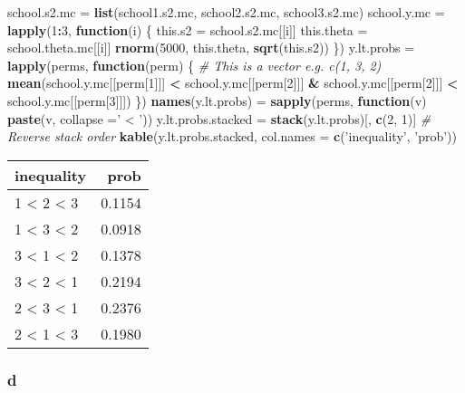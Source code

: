 \documentclass[]{article}
\newenvironment{Shaded}{\begin{snugshade}}{\end{snugshade}}
\newcommand{\CommentTok}[1]{\textcolor[rgb]{0.56,0.35,0.01}{\textit{#1}}}
\newcommand{\ControlFlowTok}[1]{\textcolor[rgb]{0.13,0.29,0.53}{\textbf{#1}}}
\newcommand{\DataTypeTok}[1]{\textcolor[rgb]{0.13,0.29,0.53}{#1}}
\newcommand{\DecValTok}[1]{\textcolor[rgb]{0.00,0.00,0.81}{#1}}
\newcommand{\KeywordTok}[1]{\textcolor[rgb]{0.13,0.29,0.53}{\textbf{#1}}}
\newcommand{\NormalTok}[1]{#1}
\newcommand{\OperatorTok}[1]{\textcolor[rgb]{0.81,0.36,0.00}{\textbf{#1}}}
\newcommand{\StringTok}[1]{\textcolor[rgb]{0.31,0.60,0.02}{#1}}
\begin{document}
\begin{Shaded}
\begin{Highlighting}[]
\NormalTok{school.s2.mc =}\StringTok{ }\KeywordTok{list}\NormalTok{(school1.s2.mc, school2.s2.mc, school3.s2.mc)}
\NormalTok{school.y.mc =}\StringTok{ }\KeywordTok{lapply}\NormalTok{(}\DecValTok{1}\OperatorTok{:}\DecValTok{3}\NormalTok{, }\ControlFlowTok{function}\NormalTok{(i) \{}
\NormalTok{  this.s2 =}\StringTok{ }\NormalTok{school.s2.mc[[i]]}
\NormalTok{  this.theta =}\StringTok{ }\NormalTok{school.theta.mc[[i]]}
  \KeywordTok{rnorm}\NormalTok{(}\DecValTok{5000}\NormalTok{, this.theta, }\KeywordTok{sqrt}\NormalTok{(this.s2))}
\NormalTok{\})}
\NormalTok{y.lt.probs =}\StringTok{ }\KeywordTok{lapply}\NormalTok{(perms, }\ControlFlowTok{function}\NormalTok{(perm) \{}
  \CommentTok{# This is a vector e.g. c(1, 3, 2)}
  \KeywordTok{mean}\NormalTok{(school.y.mc[[perm[}\DecValTok{1}\NormalTok{]]] }\OperatorTok{<}\StringTok{ }\NormalTok{school.y.mc[[perm[}\DecValTok{2}\NormalTok{]]] }\OperatorTok{&}
\StringTok{         }\NormalTok{school.y.mc[[perm[}\DecValTok{2}\NormalTok{]]] }\OperatorTok{<}\StringTok{ }\NormalTok{school.y.mc[[perm[}\DecValTok{3}\NormalTok{]]])}
\NormalTok{\})}
\KeywordTok{names}\NormalTok{(y.lt.probs) =}\StringTok{ }\KeywordTok{sapply}\NormalTok{(perms, }\ControlFlowTok{function}\NormalTok{(v) }\KeywordTok{paste}\NormalTok{(v, }\DataTypeTok{collapse =}\StringTok{' < '}\NormalTok{))}
\NormalTok{y.lt.probs.stacked =}\StringTok{ }\KeywordTok{stack}\NormalTok{(y.lt.probs)[, }\KeywordTok{c}\NormalTok{(}\DecValTok{2}\NormalTok{, }\DecValTok{1}\NormalTok{)] }\CommentTok{# Reverse stack order}
\KeywordTok{kable}\NormalTok{(y.lt.probs.stacked, }\DataTypeTok{col.names =} \KeywordTok{c}\NormalTok{(}\StringTok{'inequality'}\NormalTok{, }\StringTok{'prob'}\NormalTok{))}
\end{Highlighting}
\end{Shaded}

\begin{longtable}[]{@{}lr@{}}
\toprule
inequality & prob\tabularnewline
\midrule
\endhead
1 \textless{} 2 \textless{} 3 & 0.1154\tabularnewline
1 \textless{} 3 \textless{} 2 & 0.0918\tabularnewline
3 \textless{} 1 \textless{} 2 & 0.1378\tabularnewline
3 \textless{} 2 \textless{} 1 & 0.2194\tabularnewline
2 \textless{} 3 \textless{} 1 & 0.2376\tabularnewline
2 \textless{} 1 \textless{} 3 & 0.1980\tabularnewline
\bottomrule
\end{longtable}

\hypertarget{d}{%
\subsubsection{d}\label{d}}
\end{document}
